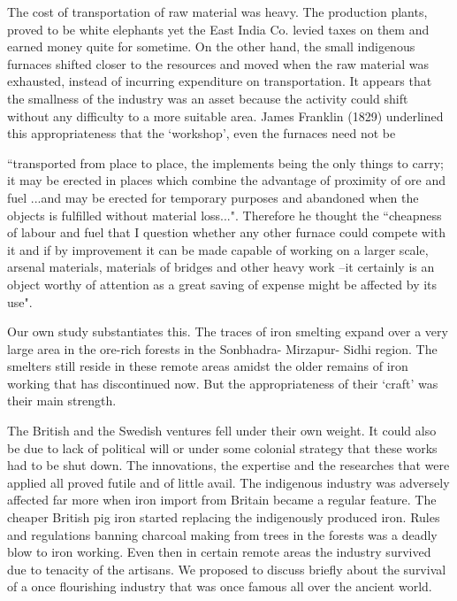 The cost of transportation of raw material was heavy. The production plants, proved to be white elephants yet the East India Co. levied taxes on them and earned money quite for sometime. On the other hand, the small indigenous furnaces shifted closer to the resources and moved when the raw material was exhausted, instead of incurring expenditure on transportation. It appears that the smallness of the industry was an asset because the activity could shift without any difficulty to a more suitable area. James Franklin (1829) underlined this appropriateness that the `workshop', even the furnaces need not be 

{\footnotesize{``transported from place to place, the implements being the only things to carry; it may be erected in places which combine the advantage of proximity of ore and fuel ...and may be erected for temporary purposes and abandoned when the objects is fulfilled without material loss..."}}. Therefore he thought the {\footnotesize{``cheapness of labour and fuel that I question whether any other furnace could compete with it and if by improvement it can be made capable of working on a larger scale, arsenal materials, materials of bridges and other heavy work –it certainly is an object worthy of attention as a great saving of expense might be affected by its use"}}. 

Our own study substantiates this. The traces of iron smelting expand over a very large area in the ore-rich forests in the Sonbhadra- Mirzapur- Sidhi region. The smelters still reside in these remote areas amidst the older remains of iron working that has discontinued now. But the appropriateness of their `craft' was their main strength. 

The British and the Swedish ventures fell under their own weight. It could also be due to lack of political will or under some colonial strategy that these works had to be shut down. The innovations, the expertise and the researches that were applied all proved futile and of little avail. The indigenous industry was adversely affected far more when iron import from Britain became a regular feature. The cheaper British pig iron started replacing the indigenously produced iron. Rules and regulations banning charcoal making from trees in the forests was a deadly blow to iron working. Even then in certain remote areas the industry survived due to tenacity of the artisans. We proposed to discuss briefly about the survival of a once flourishing industry that was once famous all over the ancient world.

